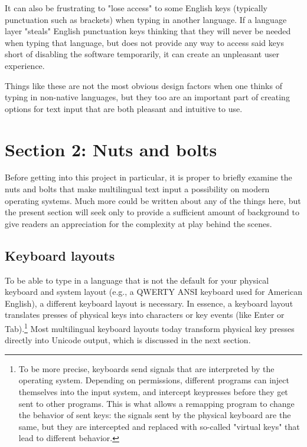 \documentclass[11pt]{article}
\begin{document}
It can also be frustrating to "lose access" to some English keys (typically punctuation such as brackets) when typing in another language. If a language layer "steals" English punctuation keys thinking that they will never be needed when typing that language, but does not provide any way to access said keys short of disabling the software temporarily, it can create an unpleasant user experience.

Things like these are not the most obvious design factors when one thinks of typing in non-native languages, but they too are an important part of creating options for text input that are both pleasant and intuitive to use.

\section{Section 2: Nuts and bolts}
\label{sec:org5101844}

Before getting into this project in particular, it is proper to briefly examine the nuts and bolts that make multilingual text input a possibility on modern operating systems. Much more could be written about any of the things here, but the present section will seek only to provide a sufficient amount of background to give readers an appreciation for the complexity at play behind the scenes.

\subsection{Keyboard layouts}
\label{sec:orgc031cca}

To be able to type in a language that is not the default for your physical keyboard and system layout (e.g., a QWERTY ANSI keyboard used for American English), a different keyboard layout is necessary. In essence, a keyboard layout translates presses of physical keys into characters or key events (like Enter or Tab).\footnote{To be more precise, keyboards send signals that are interpreted by the operating system. Depending on permissions, different programs can inject themselves into the input system, and intercept keypresses before they get sent to other programs. This is what allows a remapping program to change the behavior of sent keys: the signals sent by the physical keyboard are the same, but they are intercepted and replaced with so-called "virtual keys" that lead to different behavior.} Most multilingual keyboard layouts today transform physical key presses directly into Unicode output, which is discussed in the next section.
\end{document}
